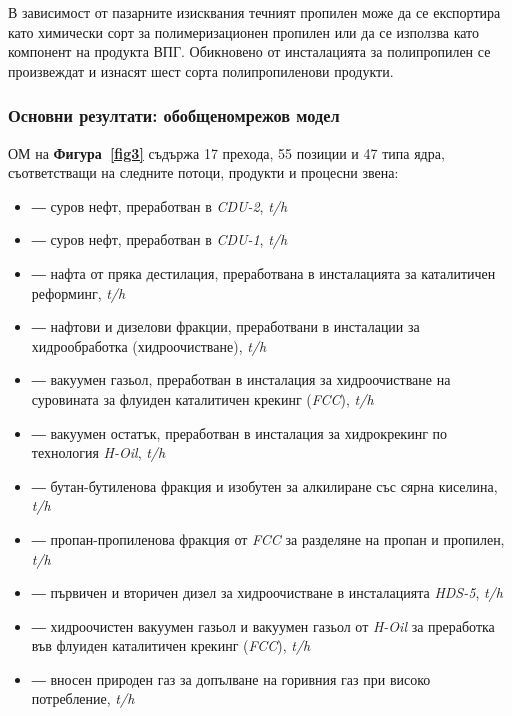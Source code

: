 В зависимост от пазарните изисквания течният пропилен може да се експортира като химически сорт за полимеризационен пропилен или да се използва като компонент на продукта ВПГ. Обикновено от инсталацията за полипропилен се произвеждат и изнасят шест сорта полипропиленови продукти.


\subsubsection{Основни резултати: обобщеномрежов модел}

\hspace*{2.5em}ОМ на \textbf{Фигура~\ref{fig3}} съдържа 17 прехода, 55 позиции и 47 типа ядра, съответстващи на следните потоци, продукти и процесни звена:
\begin{itemize}
	\item[$\sigma_1$] ― суров нефт, преработван в \textit{CDU-2}, \textit{t/h}
	\item[$\sigma_2$] ― суров нефт, преработван в \textit{CDU-1}, \textit{t/h}
	\item[$\sigma_3$] ― нафта от пряка дестилация, преработвана в инсталацията за каталитичен реформинг, \textit{t/h}
	\item[$\sigma_4$] ― нафтови и дизелови фракции, преработвани в инсталации за хидрообработка (хидроочистване), \textit{t/h}
	\item[$\sigma_5$] ― вакуумен газьол, преработван в инсталация за хидроочистване на суровината за флуиден каталитичен крекинг (\textit{FCC}), \textit{t/h}
	\item[$\sigma_6$] ― вакуумен остатък, преработван в инсталация за хидрокрекинг по технология \textit{H-Oil}, \textit{t/h}
	\item[$\sigma_7$] ― бутан-бутиленова фракция и изобутен за алкилиране със сярна киселина, \textit{t/h}
	\item[$\sigma_8$] ― пропан-пропиленова фракция от \textit{FCC} за разделяне на пропан и пропилен, \textit{t/h}
	\item[$\sigma_9$] ― първичен и вторичен дизел за хидроочистване в инсталацията \textit{HDS-5}, \textit{t/h}
	\item[$\sigma_{10}$] ― хидроочистен вакуумен газьол и вакуумен газьол от \textit{H-Oil} за преработка във флуиден каталитичен крекинг (\textit{FCC}), \textit{t/h}
	\item[$\sigma_{11}$] ― вносен природен газ за допълване на горивния газ при високо потребление, \textit{t/h}
	

\end{itemize}
